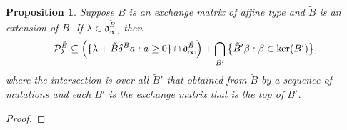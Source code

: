 \documentclass{amsart}
\newtheorem{proposition}{Proposition}[section]
\theoremstyle{definition}
\theoremstyle{remark}
\numberwithin{equation}{section}
\newcommand{\reals}{\mathbb R}
\newcommand{\set}[1]{{\lbrace #1 \rbrace}}
\newcommand{\sett}[1]{{\bigl\lbrace #1 \bigr\rbrace}}
\newcommand{\F}{{\mathcal F}}
\newcommand{\0}{{\mathbf{0}}}
\newcommand{\kk}{\mathbf{k}}
\newcommand{\tB}{{\tilde{B}}}
\newcommand{\BB}{\mathbf{B}}
\renewcommand{\P}{\mathcal{P}}
\renewcommand{\d}{{\mathfrak d}}
\begin{document}
\begin{proposition}\label{lots of kernels}
Suppose $B$ is an exchange matrix of affine type and $\tB$ is an extension of $B$.
If $\lambda\in\d_\infty^\tB$, then 
\[\P^\tB_{\lambda}\subseteq\Bigl(\set{\lambda+\tB\delta^Ba:a\ge0}\cap\d_\infty^\tB\Bigr)+\bigcap_{\tB'}\sett{\tB'\beta:\beta\in\ker(B')},\]
where the intersection is over all $\tB'$ that obtained from $\tB$ by a sequence of mutations and each $B'$ is the exchange matrix that is the top of $\tB'$.
\end{proposition}
\begin{proof}
%

\end{proof}
\end{document}
